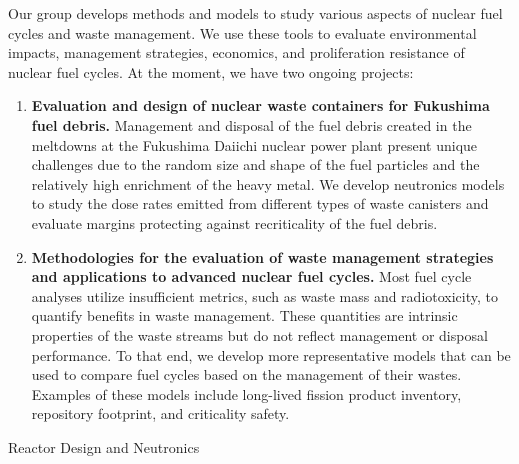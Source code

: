 Our group develops methods and models to study various aspects of nuclear fuel cycles and waste management. 
We use these tools to evaluate environmental impacts, management strategies, economics, and proliferation resistance of nuclear fuel cycles. 
At the moment, we have two ongoing projects:
\begin{enumerate}
	\item \textbf{Evaluation and design of nuclear waste containers for Fukushima fuel debris.}
	Management and disposal of the fuel debris created in the meltdowns at the Fukushima Daiichi nuclear power plant present unique challenges due to the random size and shape of the fuel particles and the relatively high enrichment of the heavy metal.
	We develop neutronics models to study the dose rates emitted from different types of waste canisters and evaluate margins protecting against recriticality of the fuel debris.
	\item \textbf{Methodologies for the evaluation of waste management strategies and applications to advanced nuclear fuel cycles.}
	Most fuel cycle analyses utilize insufficient metrics, such as waste mass and radiotoxicity, to quantify benefits in waste management. 
	These quantities are intrinsic properties of the waste streams but do not reflect management or disposal performance. 
	To that end, we develop more representative models that can be used to compare fuel cycles based on the management of their wastes. 
	Examples of these models include long-lived fission product inventory, repository footprint, and criticality safety.
\end{enumerate}

\newpage

\hrulefill
\vspace{0.5cm}

{\huge Reactor Design and Neutronics}

